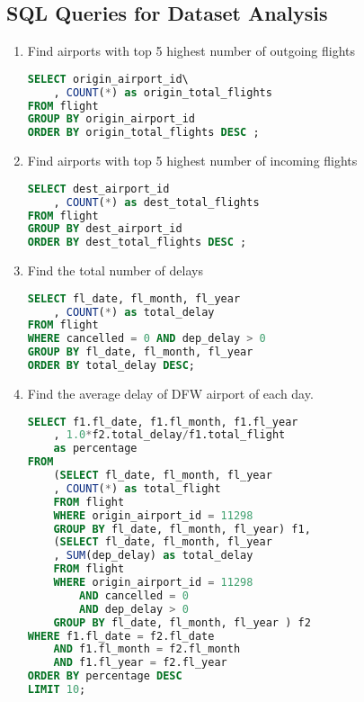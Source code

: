 \documentclass[11pt,a4paper]{article}
\begin{document}
\subsection*{SQL Queries for Dataset Analysis}
\begin{enumerate}
\item Find airports with top 5 highest number of outgoing flights
\begin{lstlisting}[frame=single, language=SQL]
SELECT origin_airport_id\
	, COUNT(*) as origin_total_flights
FROM flight
GROUP BY origin_airport_id
ORDER BY origin_total_flights DESC ;
\end{lstlisting}
\item Find airports with top 5 highest number of incoming flights
\begin{lstlisting}[frame=single, language=SQL]
SELECT dest_airport_id
	, COUNT(*) as dest_total_flights
FROM flight
GROUP BY dest_airport_id
ORDER BY dest_total_flights DESC ;
\end{lstlisting}
\item Find the total number of delays

\begin{lstlisting}[frame=single, language=SQL]
SELECT fl_date, fl_month, fl_year
	, COUNT(*) as total_delay
FROM flight
WHERE cancelled = 0 AND dep_delay > 0
GROUP BY fl_date, fl_month, fl_year
ORDER BY total_delay DESC;
\end{lstlisting}
\item Find the average delay of DFW airport of each day.
\begin{lstlisting}[frame=single, language=SQL]
SELECT f1.fl_date, f1.fl_month, f1.fl_year
	, 1.0*f2.total_delay/f1.total_flight 
	as percentage
FROM
	(SELECT fl_date, fl_month, fl_year
	, COUNT(*) as total_flight
	FROM flight
	WHERE origin_airport_id = 11298
	GROUP BY fl_date, fl_month, fl_year) f1,
	(SELECT fl_date, fl_month, fl_year
	, SUM(dep_delay) as total_delay
	FROM flight
	WHERE origin_airport_id = 11298
		AND cancelled = 0
		AND dep_delay > 0
	GROUP BY fl_date, fl_month, fl_year ) f2
WHERE f1.fl_date = f2.fl_date
	AND f1.fl_month = f2.fl_month
	AND f1.fl_year = f2.fl_year
ORDER BY percentage DESC
LIMIT 10;
\end{lstlisting}
\end{enumerate}
\end{document}
